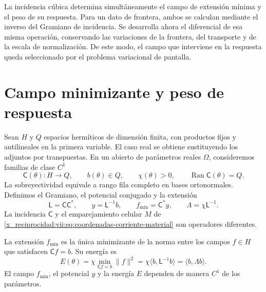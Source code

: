 La incidencia cúbica determina simultáneamente el campo de extensión
mínima y el peso de su respuesta. Para un dato de frontera, ambos se
calculan mediante el inverso del Gramiano de incidencia. Se desarrolla
ahora el diferencial de esa misma operación, conservando las variaciones
de la frontera, del transporte y de la escala de normalización. De este
modo, el campo que interviene en la respuesta queda seleccionado por
el problema variacional de pantalla.

\section{Campo minimizante y peso de respuesta}
\label{x_reciprocidad:vii:subsec:extension-minima-parametrizada}

Sean \(H\) y \(Q\) espacios hermíticos de dimensión finita, con
productos fijos y antilineales en la primera variable. El caso real se
obtiene sustituyendo los adjuntos por transpuestas. En un abierto de
parámetros reales \(\Omega\), consideremos familias de clase \(C^1\)
\[
 \mathsf C(\theta):H\longrightarrow Q,\qquad
 b(\theta)\in Q,\qquad \chi(\theta)>0,
 \qquad \operatorname{Ran}\mathsf C(\theta)=Q.
\]
La sobreyectividad equivale a rango fila completo en bases ortonormales.
Definimos el Gramiano, el potencial conjugado y la extensión
\begin{equation}
 \mathsf L=\mathsf C\mathsf C^*,\qquad
 y=\mathsf L^{-1}b,\qquad f_{\min}=\mathsf C^*y,
 \qquad \Lambda=\chi\mathsf L^{-1}.
 \label{x_reciprocidad:vii:eq:gramiano-extension-minima}
\end{equation}
La incidencia \(\mathsf C\) y el emparejamiento celular \(M\) de
\eqref{x_reciprocidad:vii:eq:coordenadas-corriente-material} son operadores diferentes.

\begin{proposition}
\label{x_reciprocidad:vii:prop:minimo-parametrizado}
La extensión \(f_{\min}\) es la única minimizante de la norma entre
los campos \(f\in H\) que satisfacen \(\mathsf C f=b\). Su energía es
\begin{equation}
 E(\theta)=\chi\min_{\mathsf C f=b}\|f\|^2
 =\chi\langle b,\mathsf L^{-1}b\rangle
 =\langle b,\Lambda b\rangle.
 \label{x_reciprocidad:vii:eq:energia-extension-minima}
\end{equation}
El campo \(f_{\min}\), el potencial \(y\) y la energía \(E\)
dependen de manera \(C^1\) de los parámetros.
\end{proposition}

